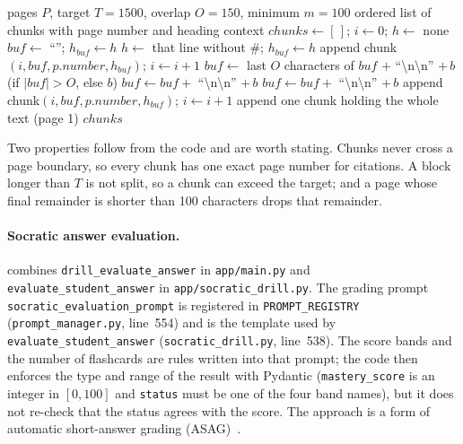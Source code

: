 \begin{algorithm}[htbp]
\caption{Heading-aware chunking with overlap}\label{alg:chunk}
\begin{algorithmic}[1]
\Require pages $P$, target $T=1500$, overlap $O=150$, minimum $m=100$
\Ensure ordered list of chunks with page number and heading context
\State $chunks \gets [\,]$; $i \gets 0$; $h \gets$ none
  \State $buf \gets$ ``''; $h_{buf} \gets h$
      \State $h \gets$ that line without \#; $h_{buf} \gets h$
    \EndIf
        \State append chunk$(i, buf, p.\textit{number}, h_{buf})$; $i \gets i+1$
        \State $buf \gets$ last $O$ characters of $buf$ $+$ ``\textbackslash n\textbackslash n'' $+\,b$ (if $|buf|>O$, else $b$)
      \Else
        \State $buf \gets buf +$ ``\textbackslash n\textbackslash n'' $+\,b$ 
      \EndIf
    \Else
      \State $buf \gets buf +$ ``\textbackslash n\textbackslash n'' $+\,b$
    \EndIf
  \EndFor
    \State append chunk$(i, buf, p.\textit{number}, h_{buf})$; $i \gets i+1$
  \EndIf
\EndFor
{}
  \State append one chunk holding the whole text (page 1)
\EndIf
\State \Return $chunks$
\end{algorithmic}
\end{algorithm}

Two properties follow from the code and are worth stating. Chunks never cross a page
boundary, so every chunk has one exact page number for citations. A block longer than
$T$ is not split, so a chunk can exceed the target; and a page whose final remainder is
shorter than 100 characters drops that remainder.

\paragraph{Socratic answer evaluation.}
 combines \texttt{drill\_evaluate\_answer} in \texttt{app/main.py}
and \texttt{evaluate\_student\_answer} in \texttt{app/socratic\_drill.py}. The grading prompt
\texttt{socratic\_evaluation\_prompt} is registered in \texttt{PROMPT\_REGISTRY}
(\texttt{prompt\_manager.py}, line~554) and is the template used by
\texttt{evaluate\_student\_answer} (\texttt{socratic\_drill.py}, line~538). The score bands
and the number of flashcards are rules written into that prompt; the code then enforces
the type and range of the result with Pydantic (\texttt{mastery\_score} is an integer in
$[0,100]$ and \texttt{status} must be one of the four band names), but it does not
re-check that the status agrees with the score. The approach is a form of automatic
short-answer grading (ASAG)~\cite{burrows2015asag}.

